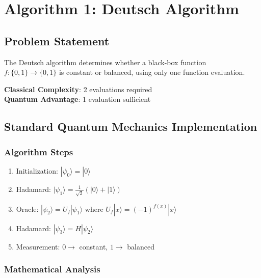 \documentclass[12pt,a4paper]{article}
\begin{document}
	\section{Algorithm 1: Deutsch Algorithm}
	
	\subsection{Problem Statement}
	
	The Deutsch algorithm determines whether a black-box function $f: \{0,1\} \rightarrow \{0,1\}$ is constant or balanced, using only one function evaluation.
	
	\textbf{Classical Complexity}: 2 evaluations required \\
	\textbf{Quantum Advantage}: 1 evaluation sufficient
	
	\subsection{Standard Quantum Mechanics Implementation}
	
	\subsubsection{Algorithm Steps}
	\begin{enumerate}
		\item Initialization: $|\psi_0\rangle = |0\rangle$
		\item Hadamard: $|\psi_1\rangle = \frac{1}{\sqrt{2}}(|0\rangle + |1\rangle)$
		\item Oracle: $|\psi_2\rangle = U_f|\psi_1\rangle$ where $U_f|x\rangle = (-1)^{f(x)}|x\rangle$
		\item Hadamard: $|\psi_3\rangle = H|\psi_2\rangle$
		\item Measurement: $0 \rightarrow$ constant, $1 \rightarrow$ balanced
	\end{enumerate}
	
	\subsubsection{Mathematical Analysis}
	
\end{document}
